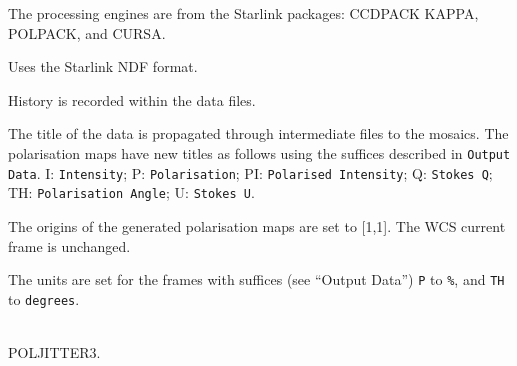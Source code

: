 \documentclass[twoside,11pt]{article}
\newcommand{\htmlref}[2]{#1}
\newcommand{\xref}[3]{#1}
\renewcommand{\_}{\texttt{\symbol{95}}}
\newcommand{\CCDPACK}{{\footnotesize CCDPACK}}
\newcommand{\CURSA}{{\footnotesize CURSA}}
\newcommand{\KAPPA}{{\footnotesize KAPPA}}
\newcommand{\POLPACK}{{\footnotesize POLPACK}}
\newcommand{\sstdiytopic}[2]{\goodbreak \item[{\hspace{-0.35em}#1\hspace{-0.35em}:}] \mbox{} \\[1.3ex] #2}
\newcommand{\sstitem}{\item}
\newcommand{\sstdiytopic}[2]{\item[{#1}:]
      \begin{description}
         #2
      \end{description}
      \\
   }
\begin{document}
{{{         \sstitem
         The processing engines are from the Starlink packages: \xref{\CCDPACK}{sun139}{}
         \xref{\KAPPA}{sun95}{}, \xref{\POLPACK}{sun223}{}, and \xref{\CURSA}{sun190}{}.

         \sstitem
         Uses the Starlink NDF format.

         \sstitem
         History is recorded within the data files.

         \sstitem
         The title of the data is propagated through intermediate files
         to the mosaics.  The polarisation maps have new titles as follows
         using the suffices described in {\tt{Output Data}}.  I: {\tt{Intensity}};
         P: {\tt{Polarisation}}; PI: {\tt{Polarised Intensity}}; Q: {\tt{Stokes Q}};
         TH: {\tt{Polarisation Angle}}; U: {\tt{Stokes U}}.

         \sstitem
         The origins of the generated polarisation maps are set to [1,1].
         The WCS current frame is unchanged.

         \sstitem
         The units are set for the frames with suffices (see \htmlref{``Output Data''}{pj_data})
         {\tt{P}} to {\tt{\%}}, and {\tt{TH}} to {\tt{degrees}}.
      }
   }
   \sstdiytopic{
      Deprecated Variants
   }{
      POL\_JITTER3.
   }
}
\end{document}
